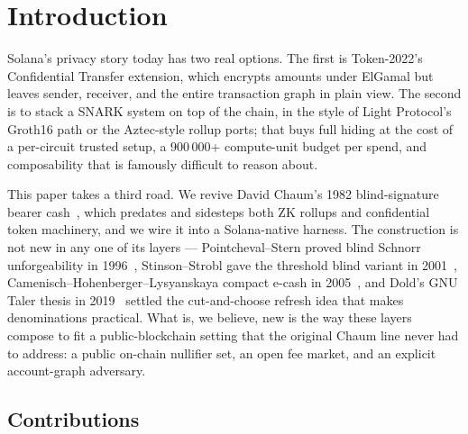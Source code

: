 \section{Introduction}
\label{sec:intro}

Solana's privacy story today has two real options. The first is Token-2022's Confidential Transfer extension, which encrypts amounts under ElGamal but leaves sender, receiver, and the entire transaction graph in plain view. The second is to stack a SNARK system on top of the chain, in the style of Light Protocol's Groth16 path or the Aztec-style rollup ports; that buys full hiding at the cost of a per-circuit trusted setup, a 900\,000+ compute-unit budget per spend, and composability that is famously difficult to reason about.

This paper takes a third road. We revive David Chaum's 1982 blind-signature bearer cash~\cite{chaum1982}, which predates and sidesteps both ZK rollups and confidential token machinery, and we wire it into a Solana-native harness. The construction is not new in any one of its layers --- Pointcheval--Stern proved blind Schnorr unforgeability in 1996~\cite{pointchevalstern1996}, Stinson--Strobl gave the threshold blind variant in 2001~\cite{stinsonstrobl2001}, Camenisch--Hohenberger--Lysyanskaya compact e-cash in 2005~\cite{chl2005}, and Dold's GNU Taler thesis in 2019~\cite{dold2019} settled the cut-and-choose refresh idea that makes denominations practical. What is, we believe, new is the way these layers compose to fit a public-blockchain setting that the original Chaum line never had to address: a public on-chain nullifier set, an open fee market, and an explicit account-graph adversary.

\subsection{Contributions}

